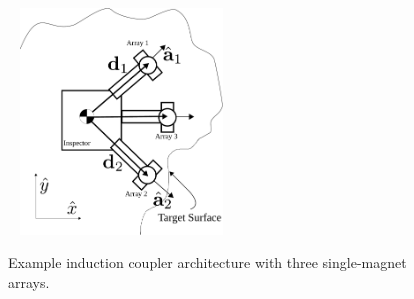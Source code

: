 \begin{figure}
\includegraphics[width = 6cm, height = 6cm ]{figures/surface_locomotion-eps-converted-to.pdf}
\label{fig:sample_coupler}
\caption{Example induction coupler architecture with three single-magnet arrays.}
\end{figure}